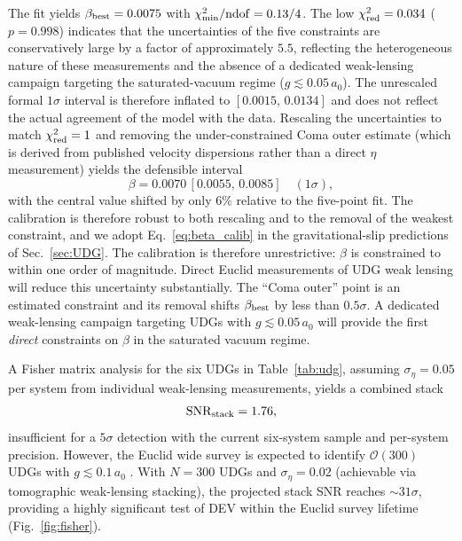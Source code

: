 \documentclass[aps,prd,twocolumn,showpacs,superscriptaddress]{revtex4-2}
\newcommand{\aO}{a_0}
\begin{document}
The fit yields $\beta_{\rm best} = 0.0075$ with
$\chi^2_{\rm min}/{\rm ndof} = 0.13/4$. The low
$\chi^2_{\rm red} = 0.034$ ($p = 0.998$) indicates that the
uncertainties of the five constraints are conservatively
large by a factor of approximately $5.5$, reflecting the
heterogeneous nature of these measurements and the absence
of a dedicated weak-lensing campaign targeting the
saturated-vacuum regime ($g \lesssim 0.05\,\aO$). The
unrescaled formal $1\sigma$ interval is therefore inflated
to $[0.0015,\,0.0134]$ and does not reflect the actual
agreement of the model with the data. Rescaling the
uncertainties to match $\chi^2_{\rm red} = 1$ and removing
the under-constrained Coma outer estimate (which is derived
from published velocity dispersions rather than a direct
$\eta$ measurement) yields the defensible interval
\begin{equation}
  \beta = 0.0070\,[0.0055,\,0.0085]\quad(1\sigma),
  \label{eq:beta_calib}
\end{equation}
with the central value shifted by only $6\%$ relative to the
five-point fit. The calibration is therefore robust to both
rescaling and to the removal of the weakest constraint, and we
adopt Eq.~\eqref{eq:beta_calib} in the gravitational-slip
predictions of Sec.~\ref{sec:UDG}.
The calibration is therefore unrestrictive: $\beta$ is
constrained to within one order of magnitude. Direct
Euclid measurements of UDG weak lensing will reduce this
uncertainty substantially.
The ``Coma outer'' point is an estimated constraint
and its removal shifts $\beta_{\rm best}$ by less than
$0.5\sigma$.
A dedicated weak-lensing campaign targeting UDGs with
$g \lesssim 0.05\,\aO$ will provide the first
\emph{direct} constraints on $\beta$ in the saturated
vacuum regime.

A Fisher matrix analysis for the six UDGs in Table~\ref{tab:udg},
assuming $\sigma_\eta = 0.05$ per system from individual
weak-lensing measurements, yields a combined stack
\begin{equation}
  \mathrm{SNR}_{\rm stack} = 1.76,
\end{equation}
insufficient for a $5\sigma$ detection with the current
six-system sample and per-system precision.
However, the Euclid wide survey is expected to identify
$\mathcal{O}(300)$ UDGs with $g \lesssim 0.1\,\aO$
\cite{vanDokkum2015}.
With $N=300$ UDGs and $\sigma_\eta=0.02$ (achievable via
tomographic weak-lensing stacking), the projected stack SNR
reaches ${\sim}31\sigma$, providing a highly significant test
of DEV within the Euclid survey lifetime
(Fig.~\ref{fig:fisher}).
\end{document}
